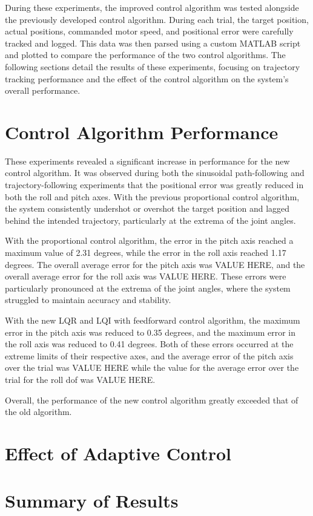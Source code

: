 During these experiments, the improved control algorithm was tested alongside the previously developed control algorithm. During each trial, the target position, actual positions, commanded motor speed, and positional error were carefully tracked and logged. This data was then parsed using a custom MATLAB script and plotted to compare the performance of the two control algorithms. The following sections detail the results of these experiments, focusing on trajectory tracking performance and the effect of the control algorithm on the system's overall performance.

\section{Control Algorithm Performance}
\label{section:trajectory_performance}

These experiments revealed a significant increase in performance for the new control algorithm. It was observed during both the sinusoidal path-following and trajectory-following experiments that the positional error was greatly reduced in both the roll and pitch axes. With the previous proportional control algorithm, the system consistently undershot or overshot the target position and lagged behind the intended trajectory, particularly at the extrema of the joint angles.

With the proportional control algorithm, the error in the pitch axis reached a maximum value of 2.31 degrees, while the error in the roll axis reached 1.17 degrees. The overall average error for the pitch axis was VALUE HERE, and the overall average error for the roll axis was VALUE HERE. These errors were particularly pronounced at the extrema of the joint angles, where the system struggled to maintain accuracy and stability.

With the new LQR and LQI with feedforward control algorithm, the maximum error in the pitch axis was reduced to 0.35 degrees, and the maximum error in the roll axis was reduced to 0.41 degrees. Both of these errors occurred at the extreme limits of their respective axes, and the average error of the pitch axis over the trial was VALUE HERE while the value for the average error over the trial for the roll dof was VALUE HERE.

Overall, the performance of the new control algorithm greatly exceeded that of the old algorithm.

\section{Effect of Adaptive Control}
\label{section:adaptive_pso_results}

\section{Summary of Results}
\label{section:results_summary}